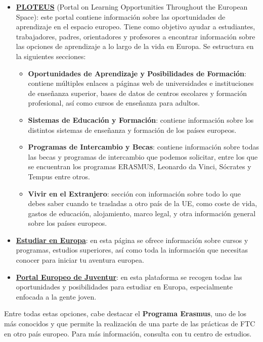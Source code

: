 \begin{itemize}
    \item \textbf{\href{https://spain.representation.ec.europa.eu/index_es}{PLOTEUS}} (Portal on Learning Opportunities Throughout the European Space): este portal contiene información sobre las oportunidades de aprendizaje en el espacio europeo. Tiene como objetivo ayudar a estudiantes, trabajadores, padres, orientadores y profesores a encontrar información sobre las opciones de aprendizaje a lo largo de la vida en Europa. Se estructura en la siguientes secciones:
    \begin{itemize}
        \item \textbf{Oportunidades de Aprendizaje y Posibilidades de Formación}: contiene múltiples enlaces a páginas web de universidades e instituciones de enseñanza superior, bases de datos de centros escolares y formación profesional, así como cursos de enseñanza para adultos.
        \item \textbf{Sistemas de Educación y Formación}: contiene información sobre los distintos sistemas de enseñanza y formación de los países europeos.
        \item \textbf{Programas de Intercambio y Becas}: contiene información sobre todas las becas y programas de intercambio que podemos solicitar, entre los que se encuentran los programas ERASMUS, Leonardo da Vinci, Sócrates y Tempus entre otros.
        \item \textbf{Vivir en el Extranjero}: sección con información sobre todo lo que debes saber cuando te trasladas a otro país de la UE, como coste de vida, gastos de educación, alojamiento, marco legal, y otra información general sobre los países europeos.
    \end{itemize}
    \item \textbf{\href{https://www.estudiareneuropa.eu/}{Estudiar en Europa}}: en esta página se ofrece información sobre cursos y programas, estudios superiores, así como toda la información que necesitas conocer para iniciar tu aventura europea.
    \item \textbf{\href{https://youth.europa.eu/home_es}{Portal Europeo de Juventur}}: en esta plataforma se recogen todas las oportunidades y posibilidades para estudiar en Europa, especialmente enfocada a la gente joven.
\end{itemize}

Entre todas estas opciones, cabe destacar el \textbf{Programa Erasmus}, uno de los más conocidos y que permite la realización de una parte de las prácticas de FTC en otro país europeo. Para más información, consulta con tu centro de estudios.

